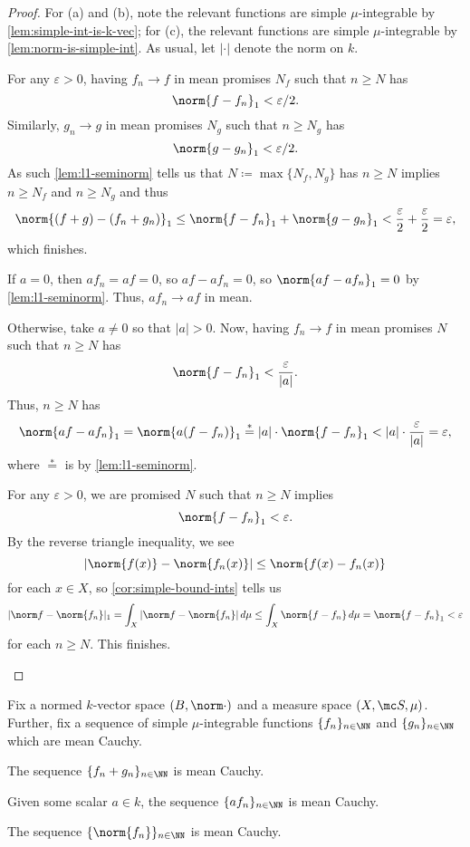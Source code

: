 \documentclass[../notes.tex]{subfiles}
\begin{document}
\begin{proof}
	For (a) and (b), note the relevant functions are simple $\mu$-integrable by \autoref{lem:simple-int-is-k-vec}; for (c), the relevant functions are simple $\mu$-integrable by \autoref{lem:norm-is-simple-int}. As usual, let $|\cdot|$ denote the norm on $k$.
	\begin{listalph}
		\item For any $\varepsilon>0$, having $f_n\to f$ in mean promises $N_f$ such that $n\ge N$ has
		\[\norm{f-f_n}_1<\varepsilon/2.\]
		Similarly, $g_n\to g$ in mean promises $N_g$ such that $n\ge N_g$ has
		\[\norm{g-g_n}_1<\varepsilon/2.\]
		As such \autoref{lem:l1-seminorm} tells us that $N\coloneqq\max\{N_f,N_g\}$ has $n\ge N$ implies $n\ge N_f$ and $n\ge N_g$ and thus
		\[\norm{(f+g)-(f_n+g_n)}_1\le\norm{f-f_n}_1+\norm{g-g_n}_1<\frac\varepsilon2+\frac\varepsilon2=\varepsilon,\]
		which finishes.
		\item If $a=0$, then $af_n=af=0$, so $af-af_n=0$, so $\norm{af-af_n}_1=0$ by \autoref{lem:l1-seminorm}. Thus, $af_n\to af$ in mean.

		Otherwise, take $a\ne0$ so that $|a|>0$. Now, having $f_n\to f$ in mean promises $N$ such that $n\ge N$ has
		\[\norm{f-f_n}_1<\frac\varepsilon{|a|}.\]
		Thus, $n\ge N$ has
		\[\norm{af-af_n}_1=\norm{a(f-f_n)}_1\stackrel*=|a|\cdot\norm{f-f_n}_1<|a|\cdot\frac\varepsilon{|a|}=\varepsilon,\]
		where $\stackrel*=$ is by \autoref{lem:l1-seminorm}.
		\item For any $\varepsilon>0$, we are promised $N$ such that $n\ge N$ implies
		\[\norm{f-f_n}_1<\varepsilon.\]
		By the reverse triangle inequality, we see
		\[|\norm{f(x)}-\norm{f_n(x)}|\le\norm{f(x)-f_n(x)}\]
		for each $x\in X$, so \autoref{cor:simple-bound-ints} tells us
		\[|\norm f-\norm{f_n}|_1=\int_X|\norm f-\norm{f_n}|\,d\mu\le\int_X\norm{f-f_n}\,d\mu=\norm{f-f_n}_1<\varepsilon\]
		for each $n\ge N$. This finishes.
		\qedhere
	\end{listalph}
\end{proof}
\begin{lemma} \label{lem:linear-combo-mean-cauchy}
	Fix a normed $k$-vector space $(B,\norm\cdot)$ and a measure space $(X,\mc S,\mu)$. Further, fix a sequence of simple $\mu$-integrable functions $\{f_n\}_{n\in\NN}$ and $\{g_n\}_{n\in\NN}$ which are mean Cauchy.
	\begin{listalph}
		\item The sequence $\{f_n+g_n\}_{n\in\NN}$ is mean Cauchy.
		\item Given some scalar $a\in k$, the sequence $\{af_n\}_{n\in\NN}$ is mean Cauchy.
		\item The sequence $\{\norm{f_n}\}_{n\in\NN}$ is mean Cauchy.
	\end{listalph}
\end{lemma}
\end{document}
